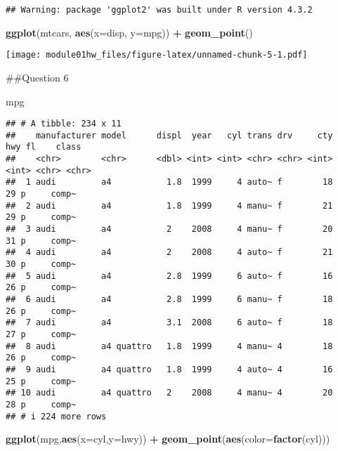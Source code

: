 \documentclass[
]{article}
\newenvironment{Shaded}{\begin{snugshade}}{\end{snugshade}}
\newcommand{\AttributeTok}[1]{\textcolor[rgb]{0.13,0.29,0.53}{#1}}
\newcommand{\FunctionTok}[1]{\textcolor[rgb]{0.13,0.29,0.53}{\textbf{#1}}}
\newcommand{\NormalTok}[1]{#1}
\newcommand{\SpecialCharTok}[1]{\textcolor[rgb]{0.81,0.36,0.00}{\textbf{#1}}}
\begin{document}
\begin{verbatim}
## Warning: package 'ggplot2' was built under R version 4.3.2
\end{verbatim}

\begin{Shaded}
\begin{Highlighting}[]
\FunctionTok{ggplot}\NormalTok{(mtcars, }\FunctionTok{aes}\NormalTok{(}\AttributeTok{x=}\NormalTok{disp, }\AttributeTok{y=}\NormalTok{mpg)) }\SpecialCharTok{+} \FunctionTok{geom\_point}\NormalTok{()}
\end{Highlighting}
\end{Shaded}

\texttt{[image: module01hw\_files/figure-latex/unnamed-chunk-5-1.pdf]}

\#\#Question 6

\begin{Shaded}
\begin{Highlighting}[]
\NormalTok{mpg}
\end{Highlighting}
\end{Shaded}

\begin{verbatim}
## # A tibble: 234 x 11
##    manufacturer model      displ  year   cyl trans drv     cty   hwy fl    class
##    <chr>        <chr>      <dbl> <int> <int> <chr> <chr> <int> <int> <chr> <chr>
##  1 audi         a4           1.8  1999     4 auto~ f        18    29 p     comp~
##  2 audi         a4           1.8  1999     4 manu~ f        21    29 p     comp~
##  3 audi         a4           2    2008     4 manu~ f        20    31 p     comp~
##  4 audi         a4           2    2008     4 auto~ f        21    30 p     comp~
##  5 audi         a4           2.8  1999     6 auto~ f        16    26 p     comp~
##  6 audi         a4           2.8  1999     6 manu~ f        18    26 p     comp~
##  7 audi         a4           3.1  2008     6 auto~ f        18    27 p     comp~
##  8 audi         a4 quattro   1.8  1999     4 manu~ 4        18    26 p     comp~
##  9 audi         a4 quattro   1.8  1999     4 auto~ 4        16    25 p     comp~
## 10 audi         a4 quattro   2    2008     4 manu~ 4        20    28 p     comp~
## # i 224 more rows
\end{verbatim}

\begin{Shaded}
\begin{Highlighting}[]
\FunctionTok{ggplot}\NormalTok{(mpg,}\FunctionTok{aes}\NormalTok{(}\AttributeTok{x=}\NormalTok{cyl,}\AttributeTok{y=}\NormalTok{hwy)) }\SpecialCharTok{+} \FunctionTok{geom\_point}\NormalTok{(}\FunctionTok{aes}\NormalTok{(}\AttributeTok{color=}\FunctionTok{factor}\NormalTok{(cyl)))}
\end{Highlighting}
\end{Shaded}
\end{document}
